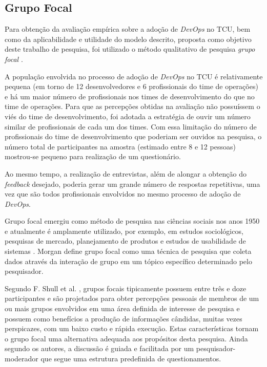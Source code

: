 \subsection{Grupo Focal}

Para obtenção da avaliação empírica sobre a adoção de {\it DevOps} no \acrshort{TCU},
bem como da aplicabilidade e utilidade do modelo descrito,
proposta como objetivo deste trabalho de pesquisa, foi utilizado o método qualitativo
de pesquisa \emph{grupo focal} \cite{focus_group_handbook}.

A população envolvida no processo de adoção de \textit{DevOps} no TCU é
relativamente pequena (em torno de 12 desenvolvedores e 6 profissionais do time
de operações) e há um maior número de profissionais nos times de
desenvolvimento do que no time de operações. Para que as percepções obtidas
na avaliação não possuíssem o viés do time de desenvolvimento, foi adotada a
estratégia de ouvir um número similar de profissionais de cada um dos times.
Com essa limitação do número de profissionais do time de desenvolvimento que
poderiam ser ouvidos na pesquisa, o número total de participantes na amostra
(estimado entre 8 e 12 pessoas) mostrou-se pequeno para realização de um
questionário.

Ao mesmo tempo, a realização de entrevistas, além de alongar a obtenção do
\textit{feedback} desejado, poderia gerar um grande número de respostas
repetitivas, uma vez que são todos profissionais envolvidos no mesmo processo
de adoção de \textit{DevOps}.

Grupo focal emergiu como método de pesquisa nas ciências sociais nos anos 1950
e atualmente é amplamente utilizado, por exemplo, em estudos sociológicos,
pesquisas de mercado, planejamento de produtos e estudos de usabilidade de
sistemas \cite{shull2007guide}. Morgan \cite{morgan1996focus} define grupo focal
como uma técnica de pesquisa que coleta dados através da interação de grupo em
um tópico específico determinado pelo pesquisador.

Segundo F. Shull et al. \cite{shull2007guide}, grupos focais tipicamente
possuem entre três e doze participantes e são projetados para obter percepções
pessoais de membros de um ou mais grupos envolvidos em uma área definida de
interesse de pesquisa e possuem como benefícios a produção de informações
cândidas, muitas vezes perspicazes, com um baixo custo e rápida execução.
Estas características tornam o grupo focal uma alternativa adequada aos
propósitos desta pesquisa. Ainda segundo os autores, a discussão é guiada e
facilitada por um pesquisador-moderador que segue uma estrutura predefinida
de questionamentos.

